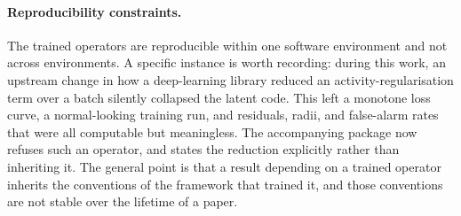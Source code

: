 \documentclass[a4paper]{cas-sc}
\begin{document}
\paragraph{Reproducibility constraints.}
The trained operators are reproducible within one software environment and not
across environments. A specific instance is worth recording:
during this work, an upstream change in how a deep-learning library reduced an
activity-regularisation term over a batch silently collapsed the
latent code. This left a monotone loss curve, a normal-looking training run, and
residuals, radii, and false-alarm rates that were all computable but
meaningless. The accompanying package now refuses such an operator, and states
the reduction explicitly rather than inheriting it. The general point is that
a result depending on a trained operator inherits the conventions of the
framework that trained it, and those conventions are not stable over the
lifetime of a paper.
\end{document}
